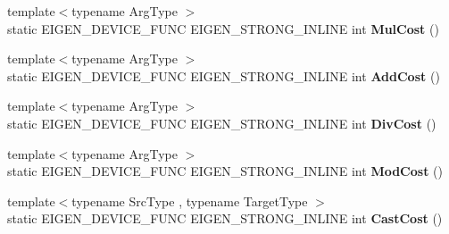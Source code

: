 \begin{DoxyCompactItemize}
{\footnotesize template$<$typename Arg\+Type $>$ }\\static E\+I\+G\+E\+N\+\_\+\+D\+E\+V\+I\+C\+E\+\_\+\+F\+U\+NC E\+I\+G\+E\+N\+\_\+\+S\+T\+R\+O\+N\+G\+\_\+\+I\+N\+L\+I\+NE int {\bfseries Mul\+Cost} ()
\item 
\mbox{\label{class_eigen_1_1_tensor_op_cost_a7c74e94f5c5992ddd756ba868df98441}} 
{\footnotesize template$<$typename Arg\+Type $>$ }\\static E\+I\+G\+E\+N\+\_\+\+D\+E\+V\+I\+C\+E\+\_\+\+F\+U\+NC E\+I\+G\+E\+N\+\_\+\+S\+T\+R\+O\+N\+G\+\_\+\+I\+N\+L\+I\+NE int {\bfseries Add\+Cost} ()
\item 
\mbox{\label{class_eigen_1_1_tensor_op_cost_ab5da69fab8e443d48fafa9880aa8691c}} 
{\footnotesize template$<$typename Arg\+Type $>$ }\\static E\+I\+G\+E\+N\+\_\+\+D\+E\+V\+I\+C\+E\+\_\+\+F\+U\+NC E\+I\+G\+E\+N\+\_\+\+S\+T\+R\+O\+N\+G\+\_\+\+I\+N\+L\+I\+NE int {\bfseries Div\+Cost} ()
\item 
\mbox{\label{class_eigen_1_1_tensor_op_cost_a7041e9d0ec3d9b67f951a6bfb68c3cc0}} 
{\footnotesize template$<$typename Arg\+Type $>$ }\\static E\+I\+G\+E\+N\+\_\+\+D\+E\+V\+I\+C\+E\+\_\+\+F\+U\+NC E\+I\+G\+E\+N\+\_\+\+S\+T\+R\+O\+N\+G\+\_\+\+I\+N\+L\+I\+NE int {\bfseries Mod\+Cost} ()
\item 
\mbox{\label{class_eigen_1_1_tensor_op_cost_a8087678093f5133cd7d001e8e4ae5899}} 
{\footnotesize template$<$typename Src\+Type , typename Target\+Type $>$ }\\static E\+I\+G\+E\+N\+\_\+\+D\+E\+V\+I\+C\+E\+\_\+\+F\+U\+NC E\+I\+G\+E\+N\+\_\+\+S\+T\+R\+O\+N\+G\+\_\+\+I\+N\+L\+I\+NE int {\bfseries Cast\+Cost} ()
\end{DoxyCompactItemize}

